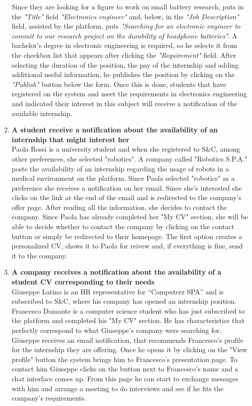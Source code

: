 \begin{enumerate}
    Since they are looking for a figure to work on small battery research, puts in the \textit{"Title"} field \textit{"Electronics engineer"} and, below, in the \textit{"Job Description"} field, assisted by the platform, puts \textit{"Searching for an electronic engineer to commit to our research project on the durability of headphone batteries"}.
    A bachelor's degree in electronic engineering is required, so he selects it from the checkbox list that appears after clicking the \textit{"Requirement"} field.
    After selecting the duration of the position, the pay of the internship and adding additional useful information, he publishes the position by clicking on the \textit{"Publish"} button below the form. Once this is done, students that have registered on the system and meet the requirements in electronics engineering and indicated their interest in this subject will receive a notification of the available internship.
    
    
      \item \textbf{A student receive a notification about the availability of an internship that might interest her}\\
       Paola Rossi is a university student and when she registered to S\&C, among other preferences, she selected "robotics". A company called "Robotics S.P.A." posts the availability of an internship regarding the usage of robots in a medical environment on the platform. Since Paola selected "robotics" as a preference she receives a notification on her email. Since she's interested she clicks on the link at the end of the email and is redirected to the company's offer page. After reading all the information, she decides to contact the company.
       Since Paola has already completed her "My CV" section, she will be able to decide whether to contact the company by clicking on the contact button or simply be redirected to their homepage. The first option creates a personalized CV, shows it to Paola for reivew and, if everything is fine, send it to the company. 
      
      
      \item \textbf{A company receives a notification about the availability of a student CV corresponding to their needs}\\
      Giuseppe Latino is an HR representative for “Computerz SPA” and is subscribed to S\&C, where his company has opened an internship position. Francesco Damante is a computer science student who has just subscribed to the platform and completed his "My CV" section. He has characteristics that perfectly correspond to what Giuseppe’s company were searching for. Giuseppe receives an email notification, that recommends Francesco's profile for the internship they are offering. Once he opens it by clicking on the "View profile" button the system brings him to Francesco’s presentation page. To contact him Giuseppe clicks on the button next to Francesco’s name and a chat interface comes up. From this page he can start to exchange messages with him and arrange a meeting to do interviews and see if he fits the company’s requirements.
      

\end{enumerate}
